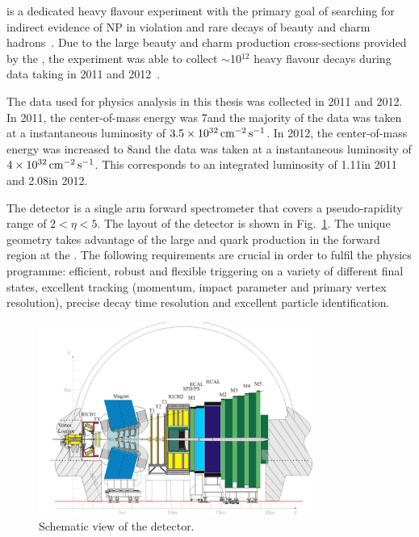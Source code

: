 \lhcb is a dedicated heavy flavour experiment with the primary goal of searching for indirect evidence of NP in \CP violation and rare decays of beauty and charm hadrons~\cite{lhcb}. Due to the large beauty and charm production cross-sections provided by the \lhc, the \lhcb experiment was able to collect $\sim$10$^{12}$ heavy flavour decays during data taking in 2011 and 2012~\cite{lhcb-perf}.

The data used for physics analysis in this thesis was collected in 2011 and 2012. In 2011, the center-of-mass energy was 7\tev and the majority of the data was taken at a instantaneous luminosity of $3.5\times10^{32}\mathrm{ \,cm}^{-2}\mathrm{{\,s}}^{-1}$. In 2012, the center-of-mass energy was increased to 8\tev and the data was taken at a instantaneous luminosity of $4\times10^{32}\mathrm{ \,cm}^{-2}\mathrm{{\,s}}^{-1}$. This corresponds to an integrated luminosity of 1.11\invfb in 2011 and 2.08\invfb in 2012.

The \lhcb detector is a single arm forward spectrometer that covers a pseudo-rapidity range of $2 < \eta < 5$. The layout of the \lhcb detector is shown in Fig.~\ref{fig:lhcb-run1}. The unique geometry takes advantage of the large \bquark and \cquark quark production in the forward region at the \lhc. The following requirements are crucial in order to fulfil the \lhcb physics programme: efficient, robust and flexible triggering on a variety of different final states, excellent tracking (momentum, impact parameter and primary vertex resolution), precise decay time resolution and excellent particle identification.

\begin{figure}[!tb]
\centering
\includegraphics[width=0.8\textwidth]{figs/detector/lhcb-run1.pdf}
\caption{Schematic view of the \lhcb detector.}
\label{fig:lhcb-run1}
\end{figure}

